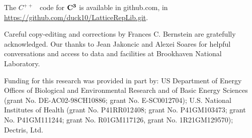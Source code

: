 \documentclass[]{iucr}              %
\numberwithin{equation}{section}
\newcommand{\CIII}[0]{$\bf{C^{3}}$}
\begin{document}
	The $C^{++}$ ~code for \CIII{} is available in github.com, in
	\url{https://github.com/duck10/LatticeRepLib.git}.
	
	
	
	
	Careful copy-editing and corrections by Frances C. Bernstein are 
	gratefully acknowledged.
	Our thanks to Jean Jakoncic and Alexei Soares for 
	helpful conversations and access to data and facilities at 
	Brookhaven National Laboratory.
	
	
	Funding for this research was provided in part by:  
	US Department of Energy Offices of Biological and 
	Environmental Research and of Basic Energy Sciences 
	(grant No. DE-AC02-98CH10886; grant No. E-SC0012704); 
	U.S. National Institutes of Health (grant No. P41RR012408; 
	grant No. P41GM103473; grant No. P41GM111244; 
	grant No. R01GM117126,
	grant No. 1R21GM129570); Dectris, Ltd.
	
	
	
	
	
	
	
	
	
	
	
	
	
\end{document}
